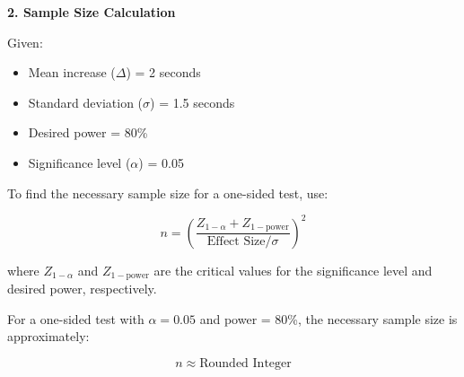 \documentclass{article}
\begin{document}
\textbf{2. Sample Size Calculation}

Given:
\begin{itemize}
    \item Mean increase (\(\Delta\)) = 2 seconds
    \item Standard deviation (\(\sigma\)) = 1.5 seconds
    \item Desired power = 80\%
    \item Significance level (\(\alpha\)) = 0.05
\end{itemize}

To find the necessary sample size for a one-sided test, use:

\[
n = \left(\frac{Z_{1-\alpha} + Z_{1-\text{power}}}{\text{Effect Size}/\sigma}\right)^2
\]

where \(Z_{1-\alpha}\) and \(Z_{1-\text{power}}\) are the critical values for the significance level and desired power, respectively.

For a one-sided test with \(\alpha = 0.05\) and power = 80\%, the necessary sample size is approximately:

\[
n \approx \text{Rounded Integer}
\]
\end{document}
